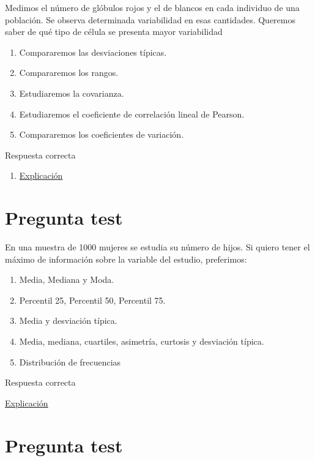 \documentclass[
]{book}
\providecommand{\tightlist}{%
  \setlength{\itemsep}{0pt}\setlength{\parskip}{0pt}}
\begin{document}
Medimos el número de glóbulos rojos y el de blancos en cada individuo de una población. Se observa determinada variabilidad en esas cantidades. Queremos saber de qué tipo de célula se presenta mayor variabilidad

\begin{enumerate}
\def\labelenumi{\alph{enumi})}
\tightlist
\item
  Compararemos las desviaciones típicas.
\item
  Compararemos los rangos.
\item
  Estudiaremos la covarianza.
\item
  Estudiaremos el coeficiente de correlación lineal de Pearson.
\item
  Compararemos los coeficientes de variación.
\end{enumerate}

Respuesta correcta

\begin{enumerate}
\def\labelenumi{\alph{enumi})}
\setcounter{enumi}{4}
\tightlist
\item
  \href{https://en.wikipedia.org/wiki/Coefficient_of_variation}{Explicación}
\end{enumerate}

\hypertarget{pregunta-test-70}{%
\section{Pregunta test}\label{pregunta-test-70}}

En una muestra de 1000 mujeres se estudia su número de hijos. Si quiero tener el máximo de información sobre la variable del estudio, preferimos:

\begin{enumerate}
\def\labelenumi{\alph{enumi})}
\tightlist
\item
  Media, Mediana y Moda.
\item
  Percentil 25, Percentil 50, Percentil 75.
\item
  Media y desviación típica.
\item
  Media, mediana, cuartiles, asimetría, curtosis y desviación típica.
\item
  Distribución de frecuencias
\end{enumerate}

Respuesta correcta

\href{https://1fjmanzano.github.io/bioestadistica/tablas-de-frecuencias.html}{Explicación}

\hypertarget{pregunta-test-71}{%
\section{Pregunta test}\label{pregunta-test-71}}
\end{document}
